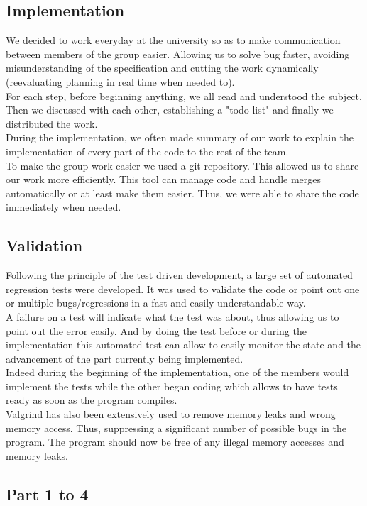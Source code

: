 \subsection{Implementation}
We decided to work everyday at the university so as to make communication
between members of the group easier. Allowing us to solve bug faster, avoiding
misunderstanding of the specification and cutting the work dynamically (reevaluating
planning in real time when needed to).\\
For each step, before beginning anything, we all read and understood the
subject. Then we discussed with each other, establishing a "todo list" and finally we
 distributed the work.\\ 
During the implementation, we often made summary of our work to explain the
implementation of every part of the code to the rest of the team.\\
To make the group work easier we used a git repository. This allowed us to
share our work more efficiently. This tool can manage code and handle merges automatically
or at least make them easier. Thus, we were able to share the code immediately
when needed.\\

\subsection{Validation}
Following the principle of the test driven development, a large set of automated
regression tests were developed. It was used to validate the code or point out
one or multiple bugs/regressions in a fast and easily understandable way. \\
A failure on a test will indicate what the test was about, thus allowing us to
point out the error easily. And by doing the test before or during the
implementation this automated test can allow to easily monitor the state and
the advancement of the part currently being implemented.\\
Indeed during the beginning of the implementation, one of the members would
implement the tests while the other began coding which allows to have tests
ready as soon as the program compiles.\\
Valgrind has also been extensively used to remove memory leaks and wrong
memory access. Thus, suppressing a significant number of possible bugs in the
program. The program should now be free of any illegal memory accesses and memory
leaks.

\subsection{Part 1 to 4}

